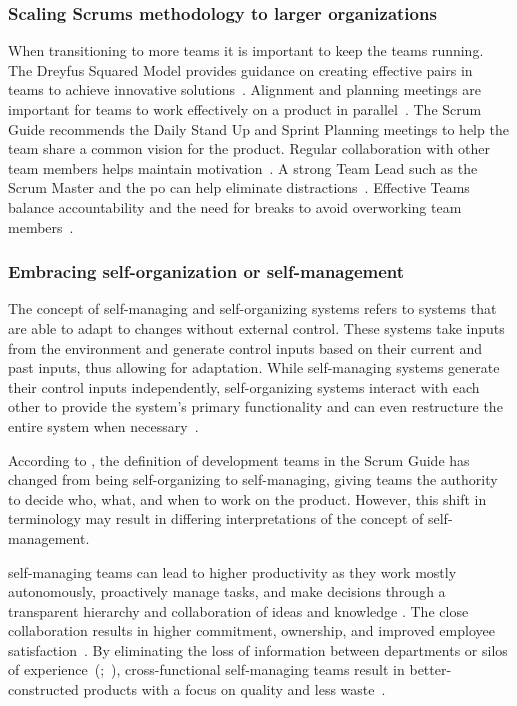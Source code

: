 \subsubsection*{Scaling Scrums methodology to larger organizations}\label{subsubsec:ScalingScrum}
When transitioning to more teams it is important to keep the teams running. The Dreyfus Squared Model provides guidance on creating effective pairs in teams to achieve innovative solutions~\cite{North2022PoE}. Alignment and planning meetings are important for teams to work effectively on a product in parallel~\cite[p.~57]{guide13scrum}. The Scrum Guide recommends the Daily Stand Up and Sprint Planning meetings to help the team share a common vision for the product. Regular collaboration with other team members helps maintain motivation~\cite[p.~7]{Zikopi2019Acs}. A strong Team Lead such as the Scrum Master and the \ac{po} can help eliminate distractions~\cite[p.~21]{Naseem2009Saa}. Effective Teams balance accountability and the need for breaks to avoid overworking team members~\cite[p.~137]{Rubin2012ESA}.

\subsubsection*{Embracing self-organization or self-management}\label{subsubsec:EmbracingSelfManagement}
The concept of \gls{self-managing} and \gls{self-organizing} systems refers to systems that are able to adapt to changes without external control. These systems take inputs from the environment and generate control inputs based on their current and past inputs, thus allowing for \gls{adaptation}. While \gls{self-managing} systems generate their control inputs independently, \gls{self-organizing} systems interact with each other to provide the system's primary functionality and can even restructure the entire system when necessary~\cite[pp.~4--5]{Muehl2007Otd}.

According to \citeauthor{Schwaber2020SGR}, the definition of development teams in the Scrum Guide has changed from being \gls{self-organizing} to \gls{self-managing}, giving teams the authority to decide who, what, and when to work on the product. However, this shift in terminology may result in differing interpretations of the concept of self-management.

\Gls{self-managing} teams can lead to higher productivity as they work mostly autonomously, proactively manage tasks, and make decisions through a transparent hierarchy and collaboration of ideas and knowledge \cite[p.~56]{Muthusamy2005Smw}. The close collaboration results in higher \gls{commitment}, \gls{ownership}, and improved employee satisfaction~\cite[p.~142]{Rubin2012ESA}. By eliminating the loss of information between departments or silos of experience~(;~), cross-functional \gls{self-managing} teams result in better-constructed products with a focus on quality and less waste~\cite[p.~142]{Rubin2012ESA}.

